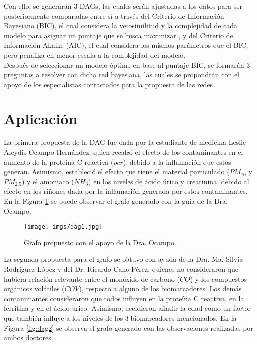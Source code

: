 \documentclass[12pt, letterpaper]{report}
\begin{document}
Con ello, se generarán 3 DAGs, las cuales serán ajustadas a los datos para ser posteriormente comparadas entre sí a través del Criterio de Información Bayesiano (BIC), el cual considera la verosimilitud y la complejidad de cada modelo para asignar un puntaje que se busca maximizar  \cite{scutari2021bayesian}, y del Criterio de Información Akaike (AIC), el cual considera los mismos parámetros que el BIC, pero penaliza en menor escala a la complejidad del modelo.
\\

Después de seleccionar un modelo óptimo en base al puntaje BIC, se formarán 3 preguntas a resolver con dicha red bayesiana, las cuales se propondrán con el apoyo de los especialistas contactados para la propuesta de las redes.

\section*{Aplicación}

La primera propuesta de la DAG fue dada por la estudiante de medicina Leslie Aleydis Ocampo Hernández, quien recalcó el efecto de los contaminantes en el aumento de la proteína C reactiva ($pcr$), debido a la inflamación que estos generan. Asimismo, estableció el efecto que tiene el material particulado ($PM_{10}$ y $PM_{2.5}$) y el amoniaco ($NH_3$) en los niveles de ácido úrico y creatinina, debido al efecto en los riñones dada por la inflamación generada por estos contaminantes. En la Figura \ref{fig:dag1} se puede observar el grafo generado con la guía de la Dra. Ocampo.

\begin{figure}[H]
    \centering
    \texttt{[image: imgs/dag1.jpg]}
    \caption{Grafo propuesto con el apoyo de la Dra. Ocampo.}
    \label{fig:dag1}
\end{figure}

La segunda propuesta para el grafo se obtuvo con ayuda de la Dra. Ma. Silvia Rodríguez López y del Dr. Ricardo Cano Pérez, quienes no consideraron que hubiera relación relevante entre el monóxido de carbono ($CO$) y los compuestos orgánicos volátiles ($COV$), respecto a alguno de los biomarcadores. Los demás contaminantes consideraron que todos influyen en la proteína C reactiva, en la ferritina y en el ácido úrico. Asimismo, decidieron añadir la edad como un factor que también influye a los niveles de los 3 biomarcadores mencionados. En la Figura \ref{fig:dag2} se observa el grafo generado con las observaciones realizadas por ambos doctores.
\end{document}
